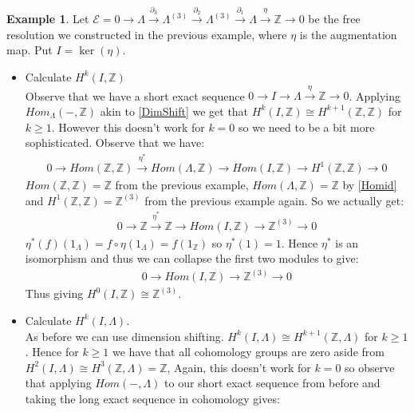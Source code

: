 \documentclass[12pt]{book}
\theoremstyle{definition}
\newtheorem{example}[theorem]{Example}
\begin{document}
\begin{example}
    Let $\mathcal{E} =  0 \rightarrow \Lambda \xrightarrow{\partial_3} \Lambda^{(3)} \xrightarrow{\partial_2} \Lambda^{(3)} \xrightarrow{\partial_1} \Lambda \xrightarrow{\eta} \mathbb{Z} \rightarrow 0$ be the free resolution we constructed in the previous example, where $\eta$ is the augmentation map. Put $I = \ker (\eta)$.
    \begin{itemize}
        \item Calculate $H^k(I, \mathbb{Z})$\\
        Observe that we have a short exact sequence $0 \rightarrow I \rightarrow \Lambda \xrightarrow{\eta} \mathbb{Z} \rightarrow 0$. Applying $Hom_\Lambda(-, \mathbb{Z})$ akin to \ref{DimShift} we get that $H^k(I, \mathbb{Z}) \cong H^{k+1}(\mathbb{Z}, \mathbb{Z})$ for $k \geq 1$. However this doesn't work for $k = 0$ so we need to be a bit more sophisticated. Observe that we have: 
        \begin{align*}
            0 \rightarrow Hom(\mathbb{Z}, \mathbb{Z}) \xrightarrow{\eta^*} Hom(\Lambda, \mathbb{Z}) \rightarrow Hom(I, \mathbb{Z}) \rightarrow H^1(\mathbb{Z}, \mathbb{Z}) \rightarrow 0
        \end{align*}
        $Hom(\mathbb{Z}, \mathbb{Z}) = \mathbb{Z}$ from the previous example, $Hom(\Lambda, \mathbb{Z}) = \mathbb{Z}$ by \ref{Homid} and $H^1(\mathbb{Z}, \mathbb{Z}) = \mathbb{Z}^{(3)}$ from the previous example again. So we actually get: 
        \begin{align*}
            0 \rightarrow \mathbb{Z} \xrightarrow{\eta^*} \mathbb{Z} \rightarrow Hom(I, \mathbb{Z}) \rightarrow \mathbb{Z}^{(3)} \rightarrow 0 
        \end{align*}
        $\eta^*(f) (1_\Lambda)= f \circ \eta (1_\Lambda)  = f(1_\mathbb{Z})$ so $\eta^*(1) = 1$. Hence $\eta^*$ is an isomorphism and thus we can collapse the first two modules to give: 
        \begin{align*}
            0 \rightarrow Hom(I, \mathbb{Z}) \rightarrow \mathbb{Z}^{(3)} \rightarrow 0
        \end{align*}
        Thus giving $H^0(I, \mathbb{Z}) \cong \mathbb{Z}^{(3)}$.  
        \item Calculate $H^k(I, \Lambda)$.\\
        As before we can use dimension shifting. $H^k(I, \Lambda) \cong H^{k+1}(\mathbb{Z}, \Lambda)$ for $k \geq 1$. Hence for $k \geq 1$ we have that all cohomology groups are zero aside from $H^2(I, \Lambda) \cong H^3(\mathbb{Z}, \Lambda) = \mathbb{Z}$, Again, this doesn't work for $k = 0$ so observe that applying $Hom(-, \Lambda)$ to our short exact sequence from before and taking the long exact sequence in cohomology gives: 

\end{itemize}
\end{example}
\end{document}
